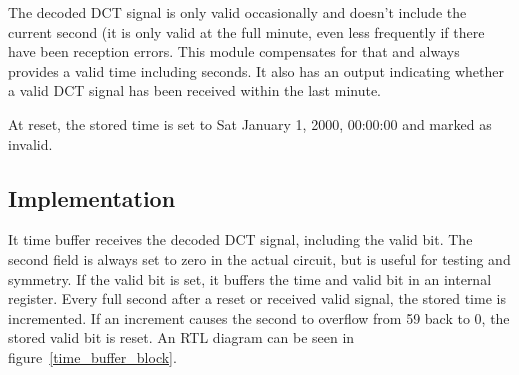 \documentclass[a4paper]{article}
\begin{document}
The decoded DCT signal is only valid occasionally and doesn't include the
current second (it is only valid at the full minute, even less frequently if
there have been reception errors. This module compensates for that and always
provides a valid time including seconds. It also has an output indicating
whether a valid DCT signal has been received within the last minute.

At reset, the stored time is set to Sat January 1, 2000, 00:00:00 and marked as
invalid.

\subsection{Implementation}

It time buffer receives the decoded DCT signal, including the valid bit. The
second field is always set to zero in the actual circuit, but is useful for
testing and symmetry. If the valid bit is set, it buffers the time and valid
bit in an internal register. Every full second after a reset or received valid
signal, the stored time is incremented. If an increment causes the second to
overflow from 59 back to 0, the stored valid bit is reset. An RTL diagram can be seen in figure~\ref{time_buffer_block}.
\end{document}
